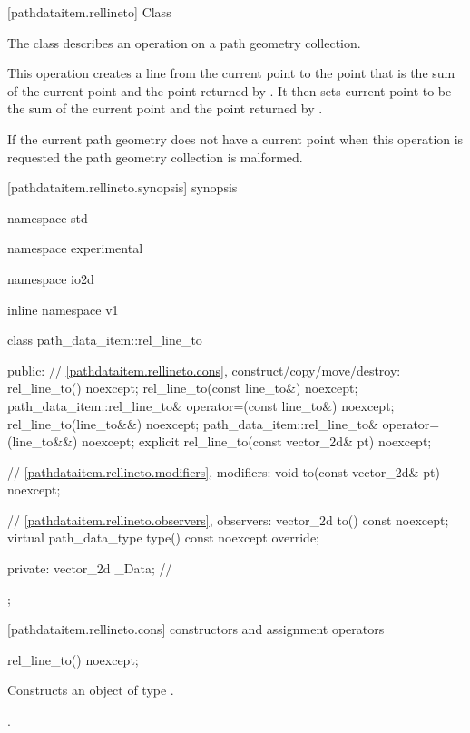  [pathdataitem.rellineto] {Class }

\pnum
{}
The class  describes an operation on a path geometry collection.

\pnum
This operation creates a line from the current point to the point that is the sum of the current point and the point returned by . It then sets current point to be the sum of the current point and the point returned by .

\pnum
If the current path geometry does not have a current point when this operation is requested the path geometry collection is malformed.

 [pathdataitem.rellineto.synopsis] { synopsis}

\begin{codeblock}
namespace std { namespace experimental { namespace io2d { inline namespace v1 {
  class path_data_item::rel_line_to {
  public:
    // \ref{pathdataitem.rellineto.cons}, construct/copy/move/destroy:
    rel_line_to() noexcept;
    rel_line_to(const line_to&) noexcept;
    path_data_item::rel_line_to& operator=(const line_to&) noexcept;
    rel_line_to(line_to&&) noexcept;
    path_data_item::rel_line_to& operator=(line_to&&) noexcept;
    explicit rel_line_to(const vector_2d& pt) noexcept;

    // \ref{pathdataitem.rellineto.modifiers}, modifiers:
    void to(const vector_2d& pt) noexcept;

    // \ref{pathdataitem.rellineto.observers}, observers:
    vector_2d to() const noexcept;
    virtual path_data_type type() const noexcept override;
    
  private:
    vector_2d _Data; // \expos
  };
} } } }
\end{codeblock}

 [pathdataitem.rellineto.cons] { constructors and assignment operators}

\begin{itemdecl}
    rel_line_to() noexcept;
\end{itemdecl}
\begin{itemdescr}
	\pnum
	\effects
	Constructs an object of type .
	
	\pnum
	\postconditions
	.
\end{itemdescr}

